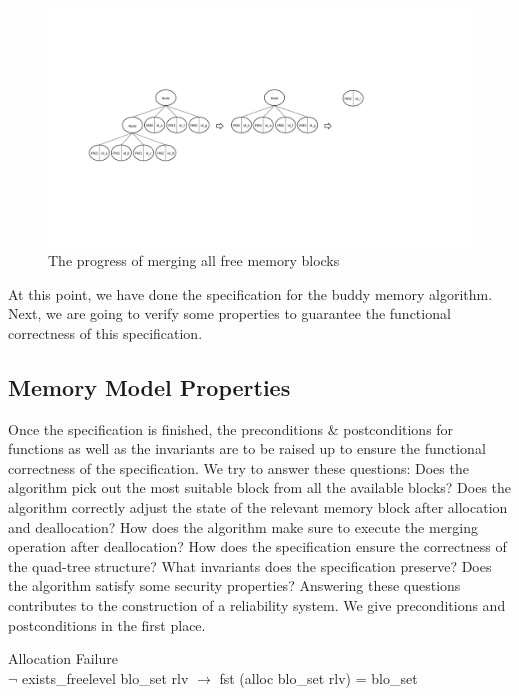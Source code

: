 \documentclass[runningheads]{llncs}
\begin{document}
\begin{figure}
\centering
\includegraphics[width=1\textwidth]{fig2.pdf}
\caption{The progress of merging all free memory blocks}
\label{fig2}
\end{figure}

At this point, we have done the specification for the buddy memory algorithm. Next, we are going to verify some properties to guarantee the functional correctness of this specification.


\subsection{Memory Model Properties}
Once the specification is finished, the preconditions $\&$ postconditions for functions as well as the invariants are to be raised up to ensure the functional correctness of the specification. We try to answer these questions: Does the algorithm pick out the most suitable block from all the available blocks? Does the algorithm correctly adjust the state of the relevant memory block after allocation and deallocation? How does the algorithm make sure to execute the merging operation after deallocation? How does the specification ensure the correctness of the quad-tree structure? What invariants does the specification preserve? Does the algorithm satisfy some security properties? Answering these questions contributes to the construction of a reliability system. We give preconditions and postconditions in the first place.

\begin{definition} {Allocation Failure} \\
$\neg$ exists\_freelevel blo\_set rlv $\longrightarrow$ fst (alloc blo\_set rlv) = blo\_set
\end{definition}
\end{document}
